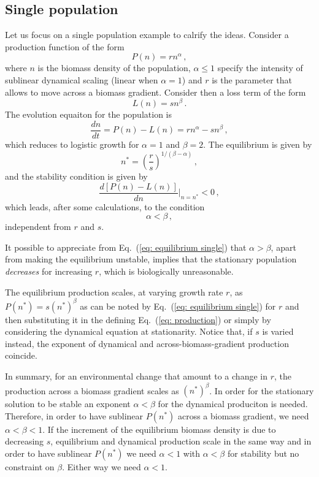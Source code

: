 \documentclass[10pt]{article}
\begin{document}
\subsection{Single population}
Let us focus on a single population example to calrify the ideas.
Consider a production function of the form
\begin{equation}
    P(n) = r n^\alpha \, ,
\label{eq: production}
\end{equation}
where $n$ is the biomass density of the population, $\alpha\leq1$
specify the intensity of sublinear dynamical scaling (linear when $\alpha=1$) 
and $r$ is the parameter that allows to move across a biomass gradient.
Consider then a loss term of the form
\begin{equation}
    L(n) = s n^\beta \, .
\end{equation} 
The evolution equaiton for the population is 
\begin{equation}
    \frac{dn}{dt} = P(n) - L(n) = r n^\alpha - s n^\beta \, ,
    \label{eq: single}
\end{equation} 
which reduces to logistic growth for $\alpha=1$ and $\beta=2$.
The equilibrium is given by
\begin{equation}
    n^* = \left(\frac{r}{s}\right)^{1/(\beta-\alpha)} \, ,
\label{eq: equilibrium single}
\end{equation}
and the stability condition is given by
\begin{equation}
    \frac{d\left[P(n)-L(n)\right]}{dn}\bigg|_{n=n^*} < 0 \, ,
\end{equation}
which leads, after some calculations, to the condition
\begin{equation}
    \alpha<\beta \, ,
\end{equation}
independent from $r$ and $s$.

It possible to appreciate from Eq.~(\ref{eq: equilibrium single})
that $\alpha>\beta$, apart from making the equilibrium unstable, implies that
the stationary population \textit{decreases} for increasing $r$,
which is biologically unreasonable.

The equilibrium production scales, at varying growth rate $r$,
as $P(n^*)=s(n^*)^\beta$ as can be noted by Eq.~(\ref{eq: equilibrium single})
for $r$ and then substituting it in the defining Eq.~(\ref{eq: production})
or simply by considering the dynamical equation at stationarity.
Notice that, if $s$ is varied instead, the exponent
of dynamical and across-biomass-gradient production coincide.

In summary, for an environmental change that amount to a change in $r$, 
the production across a biomass gradient 
scales as $(n^*)^\beta$. In order for
the stationary solution to be stable an exponent $\alpha<\beta$
for the dynamical produciton is needed.
Therefore, in order to have sublinear $P(n^*)$ across a biomass gradient,
we need $\alpha<\beta<1$.
If the increment of the equilibrium biomass density is due to decreasing $s$,
equilibrium and dynamical production scale in the same way and in order to
have sublinear $P(n^*)$ we need $\alpha<1$ with $\alpha<\beta$ for stability
but no constraint on $\beta$. Either way we need $\alpha<1$.
\end{document}
